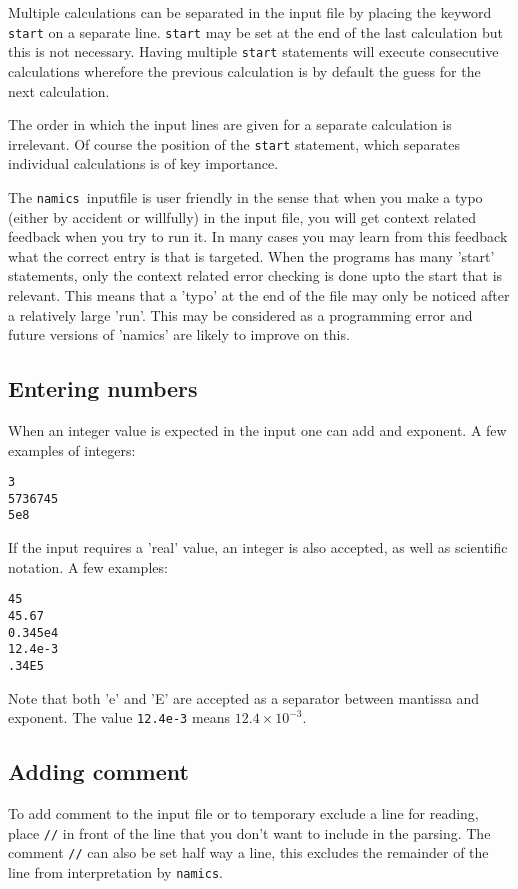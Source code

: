 \documentclass{article}
\newcommand{\namics}{{\tt namics}}
\begin{document}
Multiple calculations can be separated in the input file by placing the keyword \texttt{start} on a separate line. \texttt{start} may be set at the end of the last calculation but this is not necessary. Having multiple \texttt{start} statements will execute consecutive calculations wherefore the previous calculation is by default the guess for the next calculation. 

The order in which the input lines are given for a separate calculation is irrelevant. Of course the position of the \texttt{start} statement, which separates individual calculations is of key importance. 

The \namics\ inputfile is user friendly in the sense that when you make a typo (either by accident or willfully) in the input file, you will get context related feedback when you try to run it. In many cases you may learn from this feedback what the correct entry is that is targeted. When the programs has many 'start' statements, only the context related error checking is done upto the start that is relevant. This means that a 'typo' at the end of the file may only be noticed after a relatively large 'run'. This may be considered as a programming error and future versions of 'namics' are likely to improve on this. %

\subsection{Entering numbers}

When an integer value is expected in the input one can add and exponent. A few examples of integers:
\begin{verbatim}
3
5736745
5e8
\end{verbatim}
If the input requires a 'real' value, an integer is also accepted, as well as scientific notation. A few examples:
\begin{verbatim}
45
45.67
0.345e4
12.4e-3
.34E5
\end{verbatim}

Note that both 'e' and 'E' are accepted as a separator between mantissa and exponent. The value \texttt{12.4e-3} means $12.4\times 10^{-3}$. 

\subsection{Adding comment}
To add comment to the input file or to temporary exclude a line for reading, place \texttt{//} in front of the line that you don't want to include in the parsing. The comment \texttt{//}  can also be set half way a line, this excludes the remainder of the line from interpretation by \namics.
\end{document}
